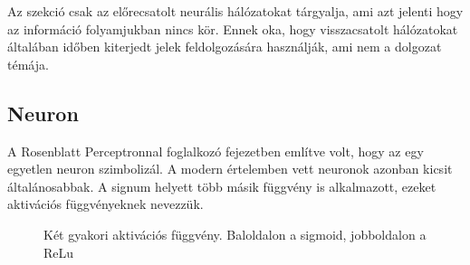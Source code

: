 Az szekció csak az előrecsatolt neurális hálózatokat tárgyalja, ami azt jelenti hogy az információ folyamjukban nincs kör. Ennek oka, hogy visszacsatolt hálózatokat általában időben kiterjedt jelek feldolgozására használják, ami nem a dolgozat témája.

\newcommand{\y}{\ensuremath{\boldsymbol y}}
\newcommand{\yvesszo}{\ensuremath{\boldsymbol y'}}
\newcommand{\x}{\ensuremath{\boldsymbol x}}
\newcommand{\w}{\ensuremath{\boldsymbol w}}

\subsection{Neuron}
\label{neuron_section}
A Rosenblatt Perceptronnal foglalkozó fejezetben említve volt, hogy az egy egyetlen neuron szimbolizál. A modern értelemben vett neuronok azonban kicsit általánosabbak. A signum helyett több másik függvény is alkalmazott, ezeket aktivációs függvényeknek nevezzük.

\begin{figure}[H]
		\begin{subfigure}{\linewidth}
		\end{subfigure}
	\caption{Két gyakori aktivációs függvény. Baloldalon a sigmoid, jobboldalon a ReLu}
\end{figure}


